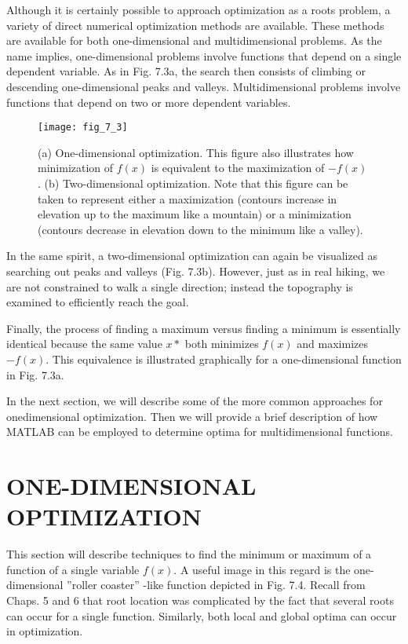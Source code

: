 \documentclass[../main.tex]{subfiles}
\begin{document}
\color{black}

Although it is certainly possible to approach optimization as a roots problem, a variety
of direct numerical optimization methods are available. These methods are available for both
one-dimensional and multidimensional problems. As the name implies, one-dimensional
problems involve functions that depend on a single dependent variable. As in Fig. 7.3a, the
search then consists of climbing or descending one-dimensional peaks and valleys. Multidimensional
problems involve functions that depend on two or more dependent variables.

\begin{figure}[H]
	\centering
	\texttt{[image: fig\_7\_3]}
	\caption{\textsf{(a) One-dimensional optimization. This figure also illustrates how minimization of $f(x)$ is
	equivalent to the maximization of $-f(x)$. (b) Two-dimensional optimization. Note that this
	figure can be taken to represent either a maximization (contours increase in elevation up to
	the maximum like a mountain) or a minimization (contours decrease in elevation down to the
	minimum like a valley).}}
	\label{fig:fig_7_3}
\end{figure}

In the same spirit, a two-dimensional optimization can again be visualized as searching out
peaks and valleys (Fig. 7.3b). However, just as in real hiking, we are not constrained to walk
a single direction; instead the topography is examined to efficiently reach the goal.

Finally, the process of finding a maximum versus finding a minimum is essentially
identical because the same value $x*$ both minimizes $f(x)$ and maximizes $-f(x)$. This
equivalence is illustrated graphically for a one-dimensional function in Fig. 7.3a.

In the next section, we will describe some of the more common approaches for onedimensional
optimization. Then we will provide a brief description of how MATLAB can
be employed to determine optima for multidimensional functions.\bigskip


\section{ONE-DIMENSIONAL OPTIMIZATION}
\label{sec:sec_7_2}

This section will describe techniques to find the minimum or maximum of a function of a
single variable $f(x)$. A useful image in this regard is the one-dimensional ''roller
coaster'' -like function depicted in Fig. 7.4. Recall from Chaps. 5 and 6 that root location
was complicated by the fact that several roots can occur for a single function. Similarly,
both local and global optima can occur in optimization.
\end{document}
